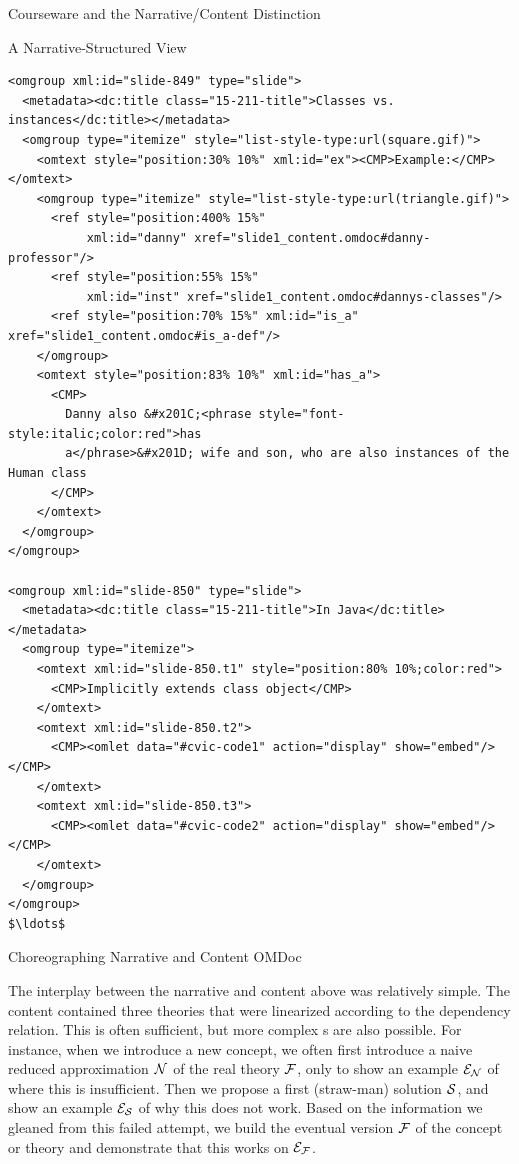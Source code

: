 \begin{tchapter}[id=courseware]{Courseware and the Narrative/Content Distinction}
\begin{tsection}[id=narrative-structured]{A Narrative-Structured View}
\begin{lstlisting}[label=lst:ann-narrative,mathescape,
    caption={The Narrative {\omdoc}  for {\myfigref{15-211}}},
    index={omgroup,omtext,CMP,metadata,dc:title,ref}]
<omgroup xml:id="slide-849" type="slide">
  <metadata><dc:title class="15-211-title">Classes vs. instances</dc:title></metadata>
  <omgroup type="itemize" style="list-style-type:url(square.gif)">
    <omtext style="position:30% 10%" xml:id="ex"><CMP>Example:</CMP></omtext>
    <omgroup type="itemize" style="list-style-type:url(triangle.gif)">
      <ref style="position:400% 15%" 
           xml:id="danny" xref="slide1_content.omdoc#danny-professor"/>
      <ref style="position:55% 15%" 
           xml:id="inst" xref="slide1_content.omdoc#dannys-classes"/>
      <ref style="position:70% 15%" xml:id="is_a" xref="slide1_content.omdoc#is_a-def"/>
    </omgroup>
    <omtext style="position:83% 10%" xml:id="has_a">
      <CMP>
        Danny also &#x201C;<phrase style="font-style:italic;color:red">has
        a</phrase>&#x201D; wife and son, who are also instances of the Human class
      </CMP>
    </omtext>
  </omgroup>
</omgroup>

<omgroup xml:id="slide-850" type="slide">
  <metadata><dc:title class="15-211-title">In Java</dc:title></metadata>
  <omgroup type="itemize">
    <omtext xml:id="slide-850.t1" style="position:80% 10%;color:red">
      <CMP>Implicitly extends class object</CMP>
    </omtext>
    <omtext xml:id="slide-850.t2">
      <CMP><omlet data="#cvic-code1" action="display" show="embed"/></CMP>
    </omtext>
    <omtext xml:id="slide-850.t3">
      <CMP><omlet data="#cvic-code2" action="display" show="embed"/></CMP>  
    </omtext>
  </omgroup>
</omgroup>
$\ldots$
\end{lstlisting}
\end{tsection}

\begin{tsection}[id=choreographing]{Choreographing  Narrative and Content OMDoc}

The interplay between the narrative and content {\omdoc} above was relatively
simple. The content {\omdoc} contained three theories that were linearized
according to the dependency relation. This is often sufficient, but more complex
{s} are also
possible. For instance, when we introduce a new concept, we often first introduce
a naive reduced approximation $\cal N$ of the real theory $\cal F$, only to show an example
$\cal E_N$ of where this is insufficient. Then we propose a first (straw-man)
solution $\cal S$, and show an example $\cal E_S$ of why this does not work. Based
on the information we gleaned from this failed attempt, we build the eventual
version $\cal F$ of the concept or theory and demonstrate that this works on $\cal
E_F$.


\end{tsection}
\end{tchapter}
